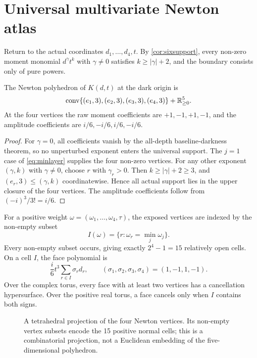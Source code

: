\section{Universal multivariate Newton atlas}\label{sec:mv1}

Return to the actual coordinates \(d_1,\ldots,d_4,t\).  By
\cref{cor:sixsupport}, every non-zero moment monomial \(d^\gamma t^k\) with
\(\gamma\ne0\) satisfies \(k\ge|\gamma|+2\), and the boundary consists only of
pure powers.

\begin{theorem}\label{thm:universalnewton}
The Newton polyhedron of \(K(d,t)\) at the dark origin is
\begin{equation}\label{eq:universalNP}
\operatorname{conv}\{(e_1,3),(e_2,3),(e_3,3),(e_4,3)\}+\mathbb R_{\ge0}^{5}.
\end{equation}
At the four vertices the raw moment coefficients are \(+1,-1,+1,-1\), and the
amplitude coefficients are \(i/6,-i/6,i/6,-i/6\).
\end{theorem}
\begin{proof}
For \(\gamma=0\), all coefficients vanish by the all-depth baseline-darkness
theorem, so no unperturbed exponent enters the universal support.  The
\(j=1\) case of \cref{eq:minlayer} supplies the four non-zero vertices.  For
any other exponent \((\gamma,k)\) with \(\gamma\ne0\), choose \(r\) with
\(\gamma_r>0\).  Then \(k\ge|\gamma|+2\ge3\), and
\((e_r,3)\le(\gamma,k)\) coordinatewise.  Hence all actual support lies in the
upper closure of the four vertices.  The amplitude coefficients follow from
\((-i)^3/3!=i/6\).
\end{proof}

For a positive weight \(\omega=(\omega_1,\ldots,\omega_4,\tau)\), the exposed
vertices are indexed by the non-empty subset
\[
I(\omega)=\{r:\omega_r=\min_j\omega_j\}.
\]
Every non-empty subset occurs, giving exactly \(2^4-1=15\) relatively open
cells.  On a cell \(I\), the face polynomial is
\begin{equation}\label{eq:mvface}
\frac{i}{6}t^3\sum_{r\in I}\sigma_r d_r,\qquad
(\sigma_1,\sigma_2,\sigma_3,\sigma_4)=(1,-1,1,-1).
\end{equation}
Over the complex torus, every face with at least two vertices has a cancellation
hypersurface.  Over the positive real torus, a face cancels only when \(I\)
contains both signs.

\begin{figure}[ht]
\centering
\caption{A tetrahedral projection of the four Newton vertices.  Its non-empty
vertex subsets encode the 15 positive normal cells; this is a combinatorial
projection, not a Euclidean embedding of the five-dimensional polyhedron.}
\label{fig:mv1cells}
\end{figure}

